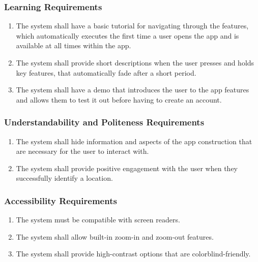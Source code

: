\documentclass[]{article}
\begin{document}
\subsubsection{Learning Requirements}
\label{ssub:learning_requirements}
\begin{enumerate}[{UH-L}1. ]
	\item The system shall have a basic tutorial for navigating through the features, which automatically executes the first time a user opens the app and is available at all times within the app.
	\item The system shall provide short descriptions when the user presses and holds key features, that automatically fade after a short period.
	\item The system shall have a demo that introduces the user to the app features and allows them to test it out before having to create an account.
\end{enumerate}

\subsubsection{Understandability and Politeness Requirements}
\label{ssub:understandability_and_politeness_requirements}
\begin{enumerate}[{UH-UP}1. ]
	\item The system shall hide information and aspects of the app construction that are necessary for the user to interact with.
	\item The system shall provide positive engagement with the user when they successfully identify a location.
\end{enumerate}

\subsubsection{Accessibility Requirements}
\label{ssub:accessibility_requirements}
\begin{enumerate}[{UH-A}1. ]
	\item The system must be compatible with screen readers.
	\item The system shall allow built-in zoom-in and zoom-out features.
	\item The system shall provide high-contrast options that are colorblind-friendly.
\end{enumerate}
\end{document}
